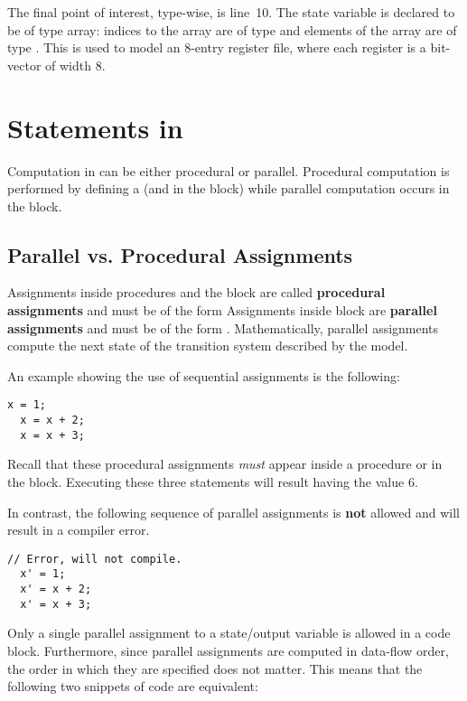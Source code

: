 The final point of interest, type-wise, is line~10. The state variable  is declared to be of type array: indices to the array are of type  and elements of the array are of type . This is used to model an 8-entry register file, where each register is a bit-vector of width 8.

\section{Statements in \uclid{}}

Computation in \uclid{} can be either procedural or parallel. Procedural computation is performed by defining a  (and in the  block) while parallel computation occurs in the  block.

\subsection{Parallel vs. Procedural Assignments}
Assignments inside procedures and the  block are called \textbf{procedural assignments} and must be of the form  Assignments inside  block are \textbf{parallel assignments} and must be of the form . Mathematically, parallel assignments compute the next state of the transition system described by the model.

An example showing the use of sequential assignments is the following:

\begin{lstlisting}[language=uclid,style=uclidstyle]
  x = 1;
  x = x + 2;
  x = x + 3;
\end{lstlisting}

    Recall that these procedural assignments \emph{must} appear inside a procedure or in the  block. Executing these three statements will result  having the value 6.

    In contrast, the following sequence of parallel assignments is \textbf{not} allowed and will result in a compiler error.
\begin{lstlisting}[language=uclid,style=uclidstyle]
  // Error, will not compile.
  x' = 1;
  x' = x + 2;
  x' = x + 3;
\end{lstlisting}
Only a single parallel assignment to a state/output variable is allowed in a code block. Furthermore, since parallel assignments are computed in data-flow order, the order in which they are specified does not matter. This means that the following two snippets of code are equivalent:

